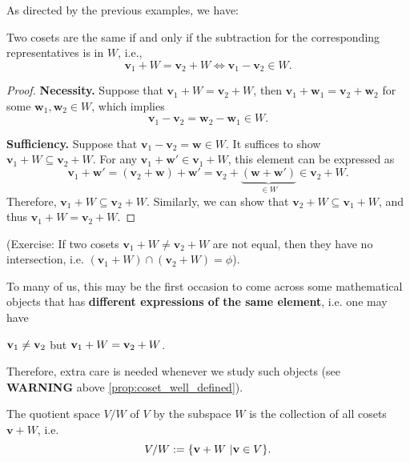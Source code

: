As directed by the previous examples, we have:
\begin{proposition}\label{prop: coset-equality}
Two cosets are the same if and only if the subtraction for the corresponding representatives is in \( W \), i.e.,
\[
\mathbf{v}_1 + W = \mathbf{v}_2 + W \iff \mathbf{v}_1 - \mathbf{v}_2 \in W.
\]
\end{proposition}

\begin{proof}
\textbf{Necessity.} Suppose that \( \mathbf{v}_1 + W = \mathbf{v}_2 + W \),  
then \( \mathbf{v}_1 + \mathbf{w}_1 = \mathbf{v}_2 + \mathbf{w}_2 \) for some \( \mathbf{w}_1, \mathbf{w}_2 \in W \),  
which implies
\[
\mathbf{v}_1 - \mathbf{v}_2 = \mathbf{w}_2 - \mathbf{w}_1 \in W.
\]

\textbf{Sufficiency.} Suppose that \( \mathbf{v}_1 - \mathbf{v}_2 = \mathbf{w} \in W \).  
It suffices to show \( \mathbf{v}_1 + W \subseteq \mathbf{v}_2 + W \).  
For any \( \mathbf{v}_1 + \mathbf{w}' \in \mathbf{v}_1 + W \), this element can be expressed as
\[
\mathbf{v}_1 + \mathbf{w}' = (\mathbf{v}_2 + \mathbf{w}) + \mathbf{w}' = \mathbf{v}_2 + \underbrace{(\mathbf{w} + \mathbf{w}')}_{\in W} \in \mathbf{v}_2 + W.
\]
Therefore, \( \mathbf{v}_1 + W \subseteq \mathbf{v}_2 + W \). Similarly, we can show that \( \mathbf{v}_2 + W \subseteq \mathbf{v}_1 + W \),  
and thus \( \mathbf{v}_1 + W = \mathbf{v}_2 + W \).
\end{proof}

\noindent (Exercise: If two cosets \(\mathbf{v}_1 +W \neq \mathbf{v}_2+W \) are not equal, then they have no intersection, i.e. \( (\mathbf{v}_1 +W) \cap   (\mathbf{v}_2 + W) = \phi \)).

\begin{remark} \label{rmk:different_expression}
    To many of us, this may be the first occasion to come across some mathematical objects that has {\bf different expressions of the same element}, i.e. one may have 
    \begin{center}
    ${\bf v}_1 \neq {\bf v}_2$ but ${\bf v}_1 + W = {\bf v}_2 + W$. 
    \end{center}
    Therefore, extra care is needed whenever we study such objects (see {\bf WARNING} above \autoref{prop:coset_well_defined}).
\end{remark}


\begin{definition}\label{def:quotient-space}
The quotient space $V/W$ of \( V \) by the subspace \( W \) is the collection of all cosets \( \mathbf{v} + W \), i.e. 
\[ V/W := \{{\bf v} + W\ | {\bf v} \in V\}.\]
\end{definition}

